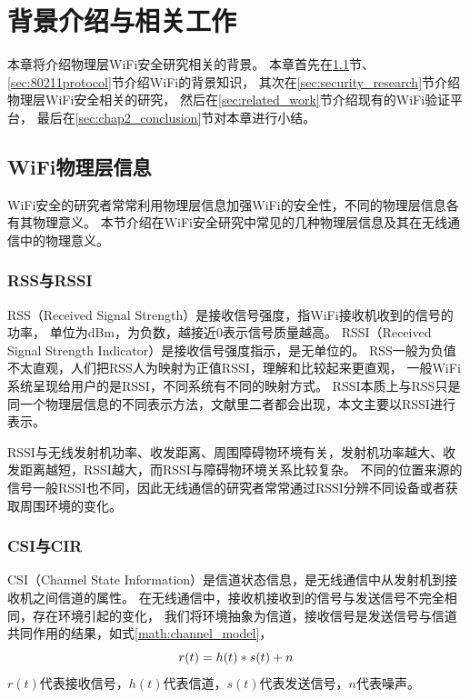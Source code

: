 
\chapter{背景介绍与相关工作}\label{chap:background}
本章将介绍物理层WiFi安全研究相关的背景。
本章首先在\ref{sec:comm_principle}节、\ref{sec:80211protocol}节介绍WiFi的背景知识，
其次在\ref{sec:security_research}节介绍物理层WiFi安全相关的研究，
然后在\ref{sec:related_work}节介绍现有的WiFi验证平台，
最后在\ref{sec:chap2_conclusion}节对本章进行小结。

	\section{WiFi物理层信息}\label{sec:comm_principle}
	WiFi安全的研究者常常利用物理层信息加强WiFi的安全性，不同的物理层信息各有其物理意义。
	本节介绍在WiFi安全研究中常见的几种物理层信息及其在无线通信中的物理意义。
		\subsection{RSS与RSSI}
		RSS（Received Signal Strength）是接收信号强度，指WiFi接收机收到的信号的功率，
		单位为dBm，为负数，越接近0表示信号质量越高。
		RSSI（Received Signal Strength Indicator）是接收信号强度指示，是无单位的。
		RSS一般为负值不太直观，人们把RSS人为映射为正值RSSI，理解和比较起来更直观，
		一般WiFi系统呈现给用户的是RSSI，不同系统有不同的映射方式\cite{wikirssi}。
		RSSI本质上与RSS只是同一个物理层信息的不同表示方法，文献里二者都会出现，本文主要以RSSI进行表示。

		RSSI与无线发射机功率、收发距离、周围障碍物环境有关，发射机功率越大、收发距离越短，RSSI越大，而RSSI与障碍物环境关系比较复杂。
		不同的位置来源的信号一般RSSI也不同，因此无线通信的研究者常常通过RSSI分辨不同设备或者获取周围环境的变化。

		\subsection{CSI与CIR}\label{sec:background_csi}
		CSI（Channel State Information）是信道状态信息，是无线通信中从发射机到接收机之间信道的属性。
		在无线通信中，接收机接收到的信号与发送信号不完全相同，存在环境引起的变化，
		我们将环境抽象为信道，接收信号是发送信号与信道共同作用的结果，如式\ref{math:channel_model}，
		\begin{equation}
			\centering
			r(t)=h(t)*s(t)+n
			\label{math:channel_model}
		\end{equation}
		$r(t)$代表接收信号，$h(t)$代表信道，$s(t)$代表发送信号，$n$代表噪声。

